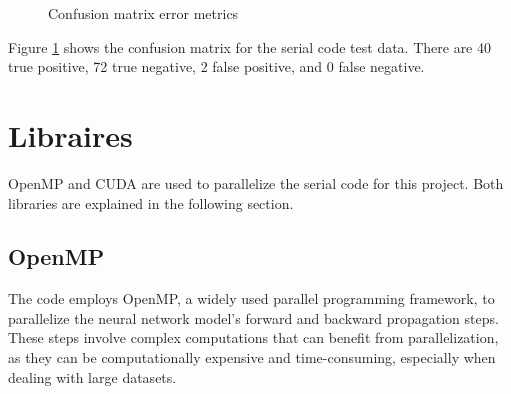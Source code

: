 \documentclass[11pt]{article}
\begin{document}
\begin{figure}[!h]
\centering
{}
\caption{Confusion matrix error metrics} \label{ConfusionMatrix}
\end{figure}

Figure \ref{ConfusionMatrix} shows the confusion matrix for the serial code test data. There are 40 true positive, 72 true negative, 2 false positive, and 0 false negative.

\clearpage



\section{Libraires}
OpenMP and CUDA are used to parallelize the serial code for this project. Both libraries are explained in the following section.

\subsection{OpenMP}

The code employs OpenMP, a widely used parallel programming framework, to parallelize the neural network model's forward and backward propagation steps. These steps involve complex computations that can benefit from parallelization, as they can be computationally expensive and time-consuming, especially when dealing with large datasets.
\end{document}
